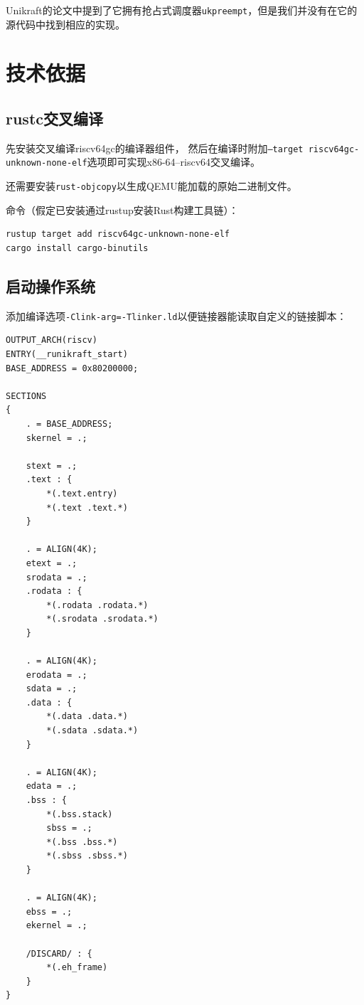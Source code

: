 \documentclass{../runikraft-report}
\begin{document}
Unikraft的论文中提到了它拥有抢占式调度器\texttt{ukpreempt}，但是我们并没有在它的源代码中找到相应的实现。

\section{技术依据}
\subsection{rustc交叉编译}
先安装交叉编译riscv64gc的编译器组件，
然后在编译时附加\texttt{--target riscv64gc-\linebreak unknown-none-elf}选项即可实现x86-64--riscv64交叉编译。

还需要安装\texttt{rust-objcopy}以生成QEMU能加载的原始二进制文件。

\noindent 命令（假定已安装通过rustup安装Rust构建工具链）：
\begin{lstlisting}
rustup target add riscv64gc-unknown-none-elf
cargo install cargo-binutils
\end{lstlisting}

\subsection{启动操作系统}
添加编译选项\texttt{-Clink-arg=-Tlinker.ld}以便链接器能读取自定义的链接脚本：
\begin{multicols}{2}
\begin{lstlisting}
OUTPUT_ARCH(riscv)
ENTRY(__runikraft_start)
BASE_ADDRESS = 0x80200000;

SECTIONS
{
    . = BASE_ADDRESS;
    skernel = .;

    stext = .;
    .text : {
        *(.text.entry)
        *(.text .text.*)
    }

    . = ALIGN(4K);
    etext = .;
    srodata = .;
    .rodata : {
        *(.rodata .rodata.*)
        *(.srodata .srodata.*)
    }

    . = ALIGN(4K);
    erodata = .;
    sdata = .;
    .data : {
        *(.data .data.*)
        *(.sdata .sdata.*)
    }

    . = ALIGN(4K);
    edata = .;
    .bss : {
        *(.bss.stack)
        sbss = .;
        *(.bss .bss.*)
        *(.sbss .sbss.*)
    }

    . = ALIGN(4K);
    ebss = .;
    ekernel = .;

    /DISCARD/ : {
        *(.eh_frame)
    }
}
\end{lstlisting}
\end{multicols}
\end{document}
